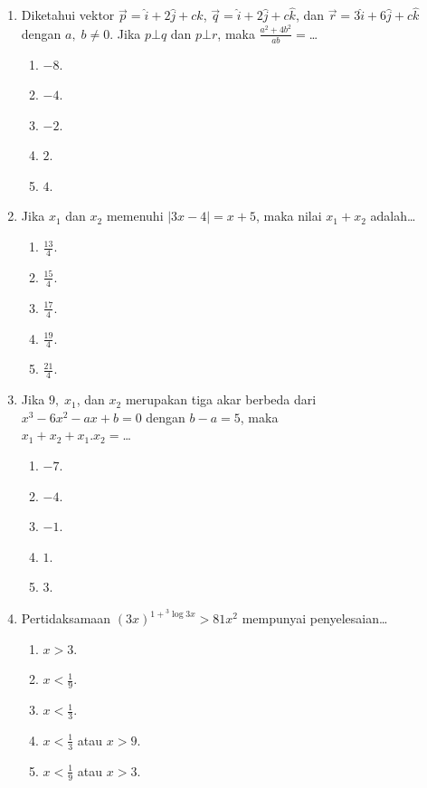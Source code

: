 \documentclass[A4,12PT, english, twocolumn]{journal}
\begin{document}
\begin{enumerate}
\item Diketahui vektor $\vec{p}=\hat{i}+2\hat{j}+c\hat{k}$, $\vec{q}=\hat{i}+2\hat{j}+c\hat{k}$, dan $\vec{r}=3\hat{i}+6\hat{j}+c\hat{k}$ dengan $a, \; b\ne 0$. Jika $p\bot q$ dan $p\bot r$, maka $\frac{{{a}^{2}}+4{{b}^{2}}}{ab}=$\dots
    \begin{enumerate}
        \item $-8$.
        \item $-4$.
        \item $-2$.
        \item $2$.
        \item $4$.
    \end{enumerate}

\item Jika $x_1$ dan $x_2$ memenuhi $|3x-4|=x+5$, maka nilai $x_1+x_2$ adalah\dots
    \begin{enumerate}
        \item $\frac{13}{4}$.
        \item $\frac{15}{4}$.
        \item $\frac{17}{4}$.
        \item $\frac{19}{4}$.
        \item $\frac{21}{4}$.
    \end{enumerate}

\item Jika $9, \; x_1$, dan $x_2$ merupakan tiga akar berbeda dari \\ $x^3-6x^2-ax+b=0$ dengan $b-a=5$, maka \\ $x_1+x_2+x_1.x_2=$\dots
    \begin{enumerate}
        \item $-7$.
        \item $-4$.
        \item $-1$.
        \item $1$.
        \item $3$.
    \end{enumerate}

\item Pertidaksamaan ${{(3x)}^{1+{}^{3}\log 3x}} > 81{{x}^{2}}$ mempunyai penyelesaian\dots
    \begin{enumerate}
        \item $x > 3$.
        \item $x < \frac{1}{9}$.
        \item $x < \frac{1}{3}$.
        \item $x < \frac{1}{3}$ atau $x > 9$.
        \item $x < \frac{1}{9}$ atau $x > 3$.
    \end{enumerate}


\end{enumerate}
\end{document}
